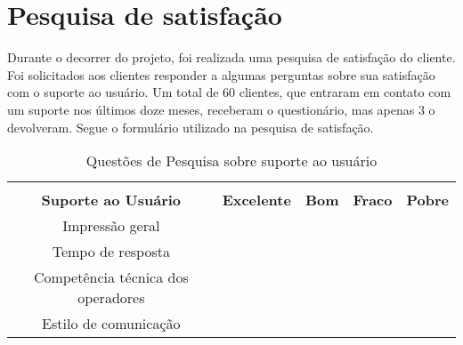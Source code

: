 \section{Pesquisa de satisfação}

Durante o decorrer do projeto, foi
realizada uma pesquisa de satisfação do
cliente. Foi solicitados aos clientes
responder a algumas perguntas sobre sua
satisfação com o suporte ao usuário. Um total de
60 clientes, que entraram em contato com um suporte
nos últimos doze meses, receberam o questionário, mas
apenas 3 o devolveram. Segue o formulário utilizado na
pesquisa de satisfação.


\begin{table}[htb]
\centering
\caption{Questões de Pesquisa sobre suporte ao usuário}
\label{my-label}
\begin{tabular}{cl|c|c|c|c|}
\cline{3-6}
\multicolumn{1}{l}{}                              &                              & \cellcolor[HTML]{9AFF99}                                     & \cellcolor[HTML]{9AFF99}                               & \cellcolor[HTML]{9AFF99}                                 & \cellcolor[HTML]{9AFF99}                                 \\ \cline{1-2}
\multicolumn{2}{|c|}{\cellcolor[HTML]{FFFC9E}\textbf{Suporte ao Usuário}}        & \multirow{-2}{*}{\cellcolor[HTML]{9AFF99}\textbf{Excelente}} & \multirow{-2}{*}{\cellcolor[HTML]{9AFF99}\textbf{Bom}} & \multirow{-2}{*}{\cellcolor[HTML]{9AFF99}\textbf{Fraco}} & \multirow{-2}{*}{\cellcolor[HTML]{9AFF99}\textbf{Pobre}} \\ \hline
\multicolumn{2}{|c|}{\cellcolor[HTML]{FFFFC7}Impressão geral}                    &                                                              &                                                        &                                                          &                                                          \\ \hline
\multicolumn{2}{|c|}{\cellcolor[HTML]{FFFFC7}Tempo de resposta}                  &                                                              &                                                        &                                                          &                                                          \\ \hline
\multicolumn{2}{|c|}{\cellcolor[HTML]{FFFFC7}Competência técnica dos operadores} &                                                              &                                                        &                                                          &                                                          \\ \hline
\multicolumn{2}{|c|}{\cellcolor[HTML]{FFFFC7}Estilo de comunicação}              &                                                              &                                                        &                                                          &                                                          \\ \hline
\end{tabular}
\end{table}


